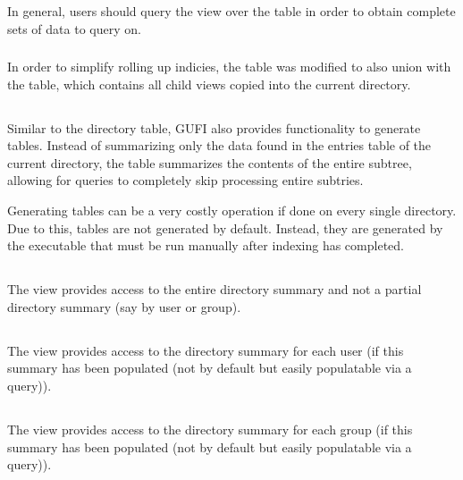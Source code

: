 In general, users should query the \pentries view over the \entries
table in order to obtain complete sets of data to query on.

\subsubsection{\pentriesrollup}
In order to simplify rolling up indicies, the \pentries table was
modified to also union with the \pentriesrollup table, which contains
all child \pentries views copied into the current directory.

\subsection{\treesummary}
Similar to the directory \summary table, GUFI also provides
functionality to generate \treesummary tables. Instead of summarizing
only the data found in the entries table of the current directory, the
\treesummary table summarizes the contents of the entire subtree,
allowing for queries to completely skip processing entire subtries.

Generating \treesummary tables can be a very costly operation if done
on every single directory. Due to this, \treesummary tables are not
generated by default. Instead, they are generated by the \bfti
executable that must be run manually after indexing has completed.

\subsection{\vsummarydir}
The \vsummarydir view provides access to the entire directory summary
and not a partial directory summary (say by user or group).

\subsection{\vsummaryuser}
The \vsummaryuser view provides access to the directory summary for
each user (if this summary has been populated (not by default but
easily populatable via a query)).

\subsection{\vsummarygroup}
The \vsummarygroup view provides access to the directory summary for
each group (if this summary has been populated (not by default but
easily populatable via a query)).

